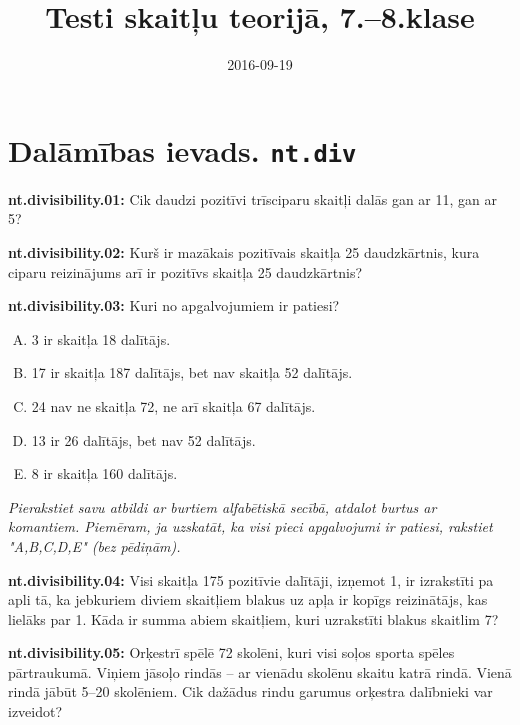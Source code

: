\documentclass[11pt]{article}
\author{\mbox{}\hspace{1ex}\vspace{-4ex}%
}
\date{2016-09-19}
\title{Testi skaitļu teorijā, 7.--8.klase\vspace{-4ex}%
}
\newenvironment{uzdevums}[1][\unskip]{%
\vspace{3mm}
\noindent
\textbf{#1:}
\noindent}
{}
\begin{document}
\maketitle

\section{Dalāmības ievads. \texttt{nt.div}}

\begin{uzdevums}[nt.divisibility.01]
Cik daudzi pozitīvi trīsciparu skaitļi dalās gan ar 11, gan ar 5? 
\end{uzdevums}


\begin{uzdevums}[nt.divisibility.02]
Kurš ir mazākais pozitīvais skaitļa 25 daudzkārtnis, kura ciparu reizinājums arī ir pozitīvs skaitļa 25 daudzkārtnis?
\end{uzdevums}


\begin{uzdevums}[nt.divisibility.03]
Kuri no apgalvojumiem ir patiesi?
\begin{enumerate}[A.]
\item 3 ir skaitļa 18 dalītājs.
\item 17 ir skaitļa 187 dalītājs, bet nav skaitļa 52 dalītājs.
\item 24 nav ne skaitļa 72, ne arī skaitļa 67 dalītājs.
\item 13 ir 26 dalītājs, bet nav 52 dalītājs. 
\item 8 ir skaitļa 160 dalītājs.
\end{enumerate}
{\em  Pierakstiet savu atbildi ar burtiem alfabētiskā secībā, atdalot burtus ar komantiem. Piemēram, ja uzskatāt, ka visi pieci apgalvojumi ir patiesi, rakstiet "A,B,C,D,E" (bez pēdiņām).}
\end{uzdevums}


\begin{uzdevums}[nt.divisibility.04]
Visi skaitļa 175 pozitīvie dalītāji, izņemot 1, ir izrakstīti pa apli tā, ka jebkuriem diviem skaitļiem 
blakus uz apļa ir kopīgs reizinātājs, 
kas lielāks par 1. Kāda ir summa abiem skaitļiem, kuri uzrakstīti blakus skaitlim 7?
\end{uzdevums}



\begin{uzdevums}[nt.divisibility.05]
Orķestrī spēlē 72 skolēni, kuri visi soļos sporta spēles pārtraukumā. Viņiem jāsoļo rindās -- ar vienādu skolēnu skaitu katrā rindā. 
Vienā rindā jābūt 5--20 skolēniem. Cik dažādus rindu garumus orķestra dalībnieki var izveidot?
\end{uzdevums}
\end{document}
